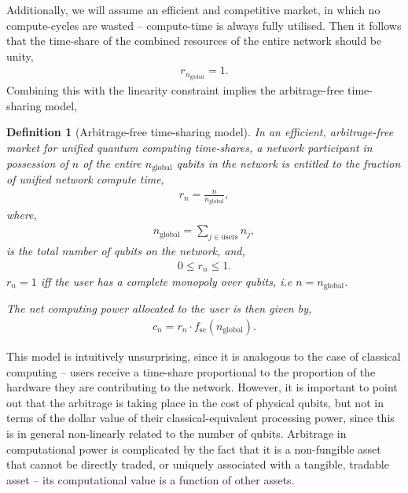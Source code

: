 \documentclass[aps, rmp, twocolumn, amsmath, amssymb, nofootinbib, superscriptaddress, longbibliography, floatfix, table-of-contents, eqsecnum]{revtex4-1}
\newcommand{\comment}[1]{{\color{blue}{\textbf{#1}}}}
\newtheorem{definition}{Definition}
\begin{document}
Additionally, we will assume an efficient and competitive market, in which no compute-cycles are wasted -- compute-time is always fully utilised. Then it follows that the time-share of the combined resources of the entire network should be unity,
\begin{align}
	r_{n_\text{global}}=1.
\end{align}
Combining this with the linearity constraint implies the arbitrage-free time-sharing model,
\begin{definition}[Arbitrage-free time-sharing model] \label{def:arb_free_ts}
In an efficient, arbitrage-free market for unified quantum computing time-shares, a network participant in possession of $n$ of the entire $n_\text{global}$ qubits in the network is entitled to the fraction of unified network compute time,
\begin{align}
	r_n = \frac{n}{n_\text{global}},
\end{align}
where,
\begin{align}
n_\text{global} = \sum_{j\in\text{users}} n_j,
\end{align}
is the total number of qubits on the network, and,
\begin{align}
0\leq r_n \leq 1.	
\end{align}
\mbox{$r_n=1$} iff the user has a complete monopoly over qubits, i.e \mbox{$n=n_\text{global}$}.

The net computing power allocated to the user is then given by,
\begin{align}
	c_n = r_n \cdot f_\text{sc}(n_\text{global}).
\end{align}
\end{definition}

This model is intuitively unsurprising, since it is analogous to the case of classical computing -- users receive a time-share proportional to the proportion of the hardware they are contributing to the network. However, it is important to point out that the arbitrage is taking place in the cost of physical qubits, but not in terms of the dollar value of their classical-equivalent processing power, since this is in general non-linearly related to the number of qubits. Arbitrage in computational power is complicated by the fact that it is a non-fungible asset that cannot be directly traded, or uniquely associated with a tangible, tradable asset -- its computational value is a function of other assets. \comment{Does that really sound right?}

%
%
\end{document}
